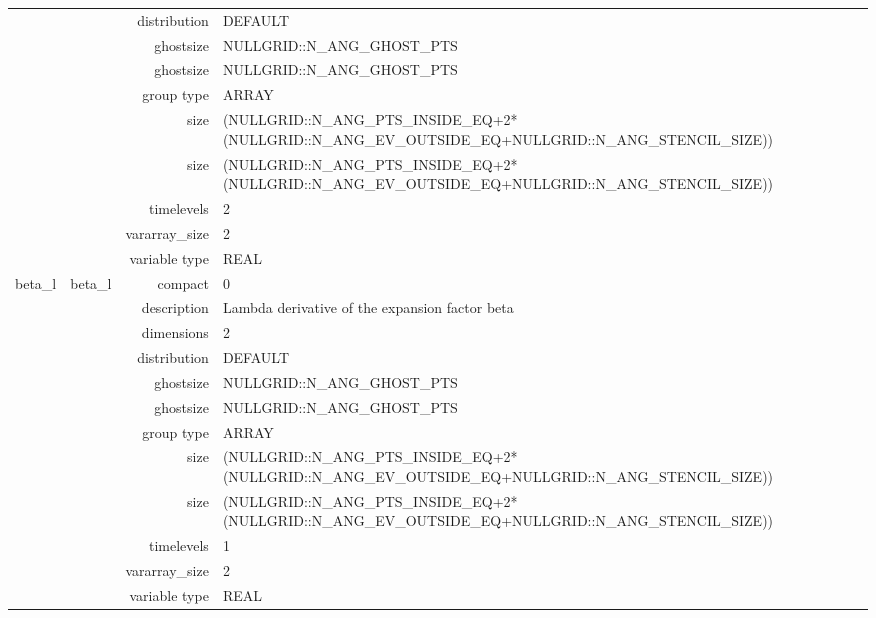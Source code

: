 \begin{tabular*}{150mm}{|c|c@{\extracolsep{\fill}}|rl|}
 &  & distribution & DEFAULT \\ 
 &  & ghostsize & NULLGRID::N\_ANG\_GHOST\_PTS \\ 
& ~ & ghostsize & NULLGRID::N\_ANG\_GHOST\_PTS \\ 
 &  & group type & ARRAY \\ 
 &  & size & (NULLGRID::N\_ANG\_PTS\_INSIDE\_EQ+2*(NULLGRID::N\_ANG\_EV\_OUTSIDE\_EQ+NULLGRID::N\_ANG\_STENCIL\_SIZE)) \\ 
& ~ & size & (NULLGRID::N\_ANG\_PTS\_INSIDE\_EQ+2*(NULLGRID::N\_ANG\_EV\_OUTSIDE\_EQ+NULLGRID::N\_ANG\_STENCIL\_SIZE)) \\ 
 &  & timelevels & 2 \\ 
 &  & vararray\_size & 2 \\ 
 &  & variable type & REAL \\ 
\hline 
beta\_l & beta\_l & compact & 0 \\ 
 &  & description & Lambda derivative of the expansion factor beta \\ 
 &  & dimensions & 2 \\ 
 &  & distribution & DEFAULT \\ 
 &  & ghostsize & NULLGRID::N\_ANG\_GHOST\_PTS \\ 
& ~ & ghostsize & NULLGRID::N\_ANG\_GHOST\_PTS \\ 
 &  & group type & ARRAY \\ 
 &  & size & (NULLGRID::N\_ANG\_PTS\_INSIDE\_EQ+2*(NULLGRID::N\_ANG\_EV\_OUTSIDE\_EQ+NULLGRID::N\_ANG\_STENCIL\_SIZE)) \\ 
& ~ & size & (NULLGRID::N\_ANG\_PTS\_INSIDE\_EQ+2*(NULLGRID::N\_ANG\_EV\_OUTSIDE\_EQ+NULLGRID::N\_ANG\_STENCIL\_SIZE)) \\ 
 &  & timelevels & 1 \\ 
 &  & vararray\_size & 2 \\ 
 &  & variable type & REAL \\ 
\hline 
\end{tabular*} 



\vspace{5mm}
\vspace{5mm}

